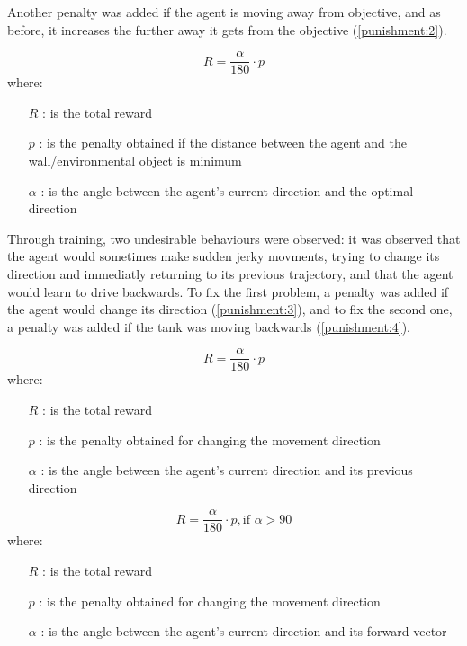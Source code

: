 Another penalty was added if the agent is moving away from objective, and as before, it increases the further away it gets from the objective (\ref{punishment:2}). 

\begin{equation} \label{punishment:2}
    R = \frac{\alpha}{180} \cdot p
\end{equation}
where:
\begin{itemize}
    \item [$R$]: is the total reward
    \item [$p$]: is the penalty obtained if the distance between the agent and the wall/environmental object is minimum
    \item [$\alpha$]: is the angle between the agent's current direction and the optimal direction
\end{itemize}

Through training, two undesirable behaviours were observed: it was observed that the agent would sometimes make sudden jerky movments, trying to change its direction and immediatly returning to its previous trajectory, and that the agent would learn to drive backwards. To fix the first problem, a penalty was added if the agent would change its direction (\ref{punishment:3}), and to fix the second one, a penalty was added if the tank was moving backwards (\ref{punishment:4}).

\begin{equation} \label{punishment:3}
    R = \frac{\alpha}{180} \cdot p
\end{equation}
where:
\begin{itemize}
    \item [$R$]: is the total reward
    \item [$p$]: is the penalty obtained for changing the movement direction
    \item [$\alpha$]: is the angle between the agent's current direction and its previous direction
\end{itemize}

\begin{equation} \label{punishment:4}
    R = \frac{\alpha}{180} \cdot p, \text{if } \alpha > 90
\end{equation}
where:
\begin{itemize}
    \item [$R$]: is the total reward
    \item [$p$]: is the penalty obtained for changing the movement direction
    \item [$\alpha$]: is the angle between the agent's current direction and its forward vector
\end{itemize}

